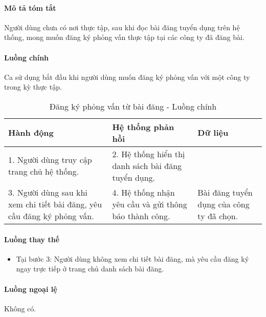 \documentclass[./../main.tex]{subfiles}
\begin{document}
\paragraph*{Mô tả tóm tắt}

Người dùng chưa có nơi thực tập, sau khi đọc bài đăng tuyển dụng trên hệ
thống, mong muốn đăng ký phỏng vấn thực tập tại các công ty đã đăng bài.

\paragraph*{Luồng chính} Ca sử dụng bắt đầu khi người dùng muốn đăng ký phỏng vấn với một công ty trong kỳ thực tập.

\begin{table}[H]
	\caption{Đăng ký phỏng vấn từ bài đăng - Luồng chính}
	\label{tab:apply_post}
	\begin{tabularx}{\textwidth}{|X|X|X|}
		\hline
		\textbf{Hành động}                                                      & \textbf{Hệ thống phản hồi}                            & \textbf{Dữ liệu}                         \\ \hline
		1. Người dùng truy cập trang chủ hệ thống.                              & 2. Hệ thống hiển thị danh sách bài đăng tuyển dụng.   &                                          \\ \hline
		3. Người dùng sau khi xem chi tiết bài đăng, yêu cầu đăng ký phỏng vấn. & 4. Hệ thống nhận yêu cầu và gửi thông báo thành công. & Bài đăng tuyển dụng của công ty đã chọn. \\ \hline
	\end{tabularx}
\end{table}

\paragraph*{Luồng thay thế}

\begin{itemize}
	\item

	      Tại bước 3: Người dùng không xem chi tiết bài đăng, mà yêu cầu đăng ký
	      ngay trực tiếp ở trang chủ danh sách bài đăng.

\end{itemize}

\paragraph*{Luồng ngoại lệ} Không có.
\end{document}
